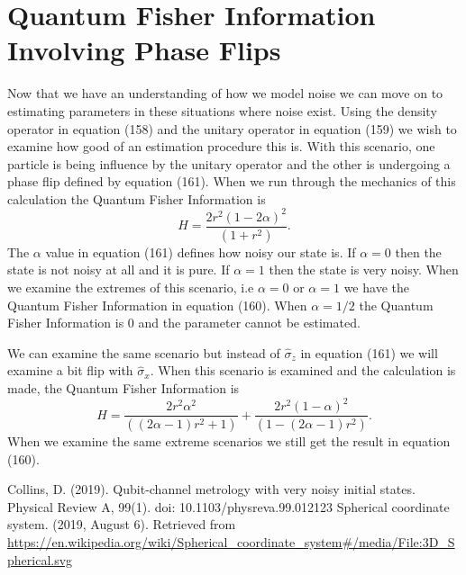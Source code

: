 \documentclass[twocolumn]{article}
\begin{document}
\section*{Quantum Fisher Information Involving Phase Flips}
Now that we have an understanding of how we model noise we can move on to estimating parameters in these situations where noise exist. Using the density operator in equation (158) and the unitary operator in equation (159) we wish to examine how good of an estimation procedure this is. With this scenario, one particle is being influence by the unitary operator and the other is undergoing a phase flip defined by equation (161). When we run through the mechanics of this calculation the Quantum Fisher Information is
\begin{equation}
H=\frac{2r^2(1-2\alpha)^2}{(1+r^2)}.
\end{equation}
The $\alpha$ value in equation (161) defines how noisy our state is. If $\alpha=0$ then the state is not noisy at all and it is pure. If $\alpha=1$ then the state is very noisy. When we examine the extremes of this scenario, i.e $\alpha=0$ or $\alpha=1$ we have the Quantum Fisher Information in equation (160). When $\alpha=1/2$ the Quantum Fisher Information is 0 and the parameter cannot be estimated.

We can examine the same scenario but instead of $\hat{\sigma}_z$ in equation (161) we will examine a bit flip with $\hat{\sigma}_x$. When this scenario is examined and the calculation is made, the Quantum Fisher Information is
\begin{equation}
H=\frac{2r^2\alpha^2}{((2\alpha-1)r^2+1)}+\frac{2r^2(1-\alpha)^2}{(1-(2\alpha-1)r^2)}.
\end{equation}
When we examine the same extreme scenarios we still get the result in equation (160).
\newpage
\begin{thebibliography}{99}
Collins, D. (2019). Qubit-channel metrology with very noisy initial states. Physical Review A, 99(1). doi: 10.1103/physreva.99.012123
Spherical coordinate system. (2019, August 6). Retrieved from \url{https://en.wikipedia.org/wiki/Spherical_coordinate_system#/media/File:3D_Spherical.svg}
\end{thebibliography}
\end{document}

